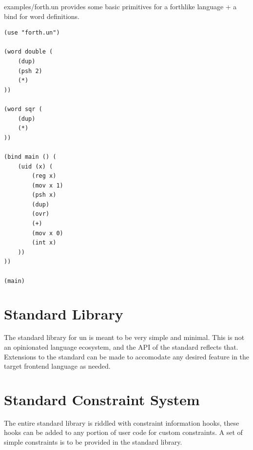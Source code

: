 \documentclass{article}
\begin{document}
	examples/forth.un provides some basic primitives for a forthlike language + a bind for word definitions.

	\begin{Verbatim}[tabsize=4]
(use "forth.un")

(word double (
	(dup)
	(psh 2)
	(*)
))

(word sqr (
	(dup)
	(*)
))

(bind main () (
	(uid (x) (
		(reg x)
		(mov x 1)
		(psh x)
		(dup)
		(ovr)
		(+)
		(mov x 0)
		(int x)
	))
))

(main)

	\end{Verbatim}

	\section{Standard Library}
	The standard library for un is meant to be very simple and minimal. This is not an opinionated language ecosystem, and the API of the standard reflects that. Extensions to the standard can be made to accomodate any desired feature in the target frontend language as needed. \\
	\section{Standard Constraint System}
	The entire standard library is riddled with constraint information hooks, these hooks can be added to any portion of user code for custom constraints. A set of simple constraints is to be provided in the standard library. 
\end{document}
